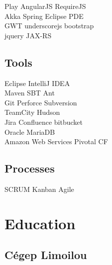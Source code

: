 \documentclass[letterpaper]{deedy-resume} %
\begin{document}
\begin{minipage}[t]{0.33\textwidth}
Play \textbullet{} AngularJS \textbullet{} RequireJS \textbullet{} \\
Akka \textbullet{} Spring \textbullet{} Eclipse PDE \\
GWT \textbullet{} underscorejs \textbullet{} bootstrap \\
jquery \textbullet{} JAX-RS

\sectionspace %

\subsection{Tools}

Eclipse \textbullet{} IntelliJ IDEA \\
Maven \textbullet{} SBT \textbullet{} Ant \\
Git \textbullet{} Perforce \textbullet{} Subversion \\
TeamCity \textbullet{} Hudson \\
Jira \textbullet{} Confluence \textbullet{} bitbucket \\
Oracle \textbullet{} MariaDB \\
Amazon Web Services \textbullet{} Pivotal CF

\sectionspace %

\subsection{Processes}
SCRUM \textbullet{} Kanban \textbullet{} Agile

\sectionspace %


\section{Education} 

\subsection{Cégep Limoilou}


\sectionspace %



\end{minipage}
\end{document}
